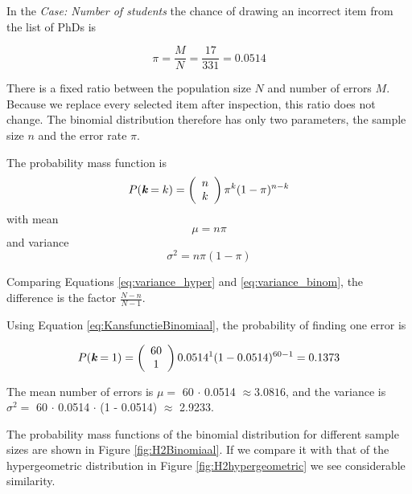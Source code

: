 \bigskip
In the \emph{Case: Number of students} the chance of drawing an incorrect item from the list of PhDs is

\begin{equation*}
\pi = \frac{M}{N} = \frac{17}{331} = 0.0514
\end{equation*}

There is a fixed ratio between the population size $N$ and number of errors $M$. Because we replace every selected item after inspection, this ratio does not change. The binomial distribution therefore has only two parameters, the sample size $n$ and the error rate $\pi$.

\bigskip
The probability mass function is
\begin{equation}
P(\textit{\textbf{k}} = k) = \left(\begin{array}{c}n\\k\end{array}\right)\pi^{k} (1-\pi)^{n-k}
\label{eq:KansfunctieBinomiaal}
\end{equation}
with mean
\begin{equation}
\mu = n\pi
\end{equation}
and variance
\begin{equation}
\sigma^2 = n\pi(1-\pi)
\label{eq:variance_binom}
\end{equation}

Comparing Equations \ref{eq:variance_hyper} and \ref{eq:variance_binom}, the difference is the factor $\frac{N - n}{N - 1}$.

Using Equation \ref{eq:KansfunctieBinomiaal}, the probability of finding one error is 

\begin{equation*}
P(\textit{\textbf{k}} = 1) = \left(\begin{array}{c}60\\1\end{array}\right)0.0514^{1} (1-0.0514)^{60-1} = 0.1373
\end{equation*}

The mean number of errors is $\mu =$ 60 $\cdot$ 0.0514 $\approx 3.0816$, and the variance is $\sigma^2 =$ 60 $\cdot$ 0.0514 $\cdot$ (1 - 0.0514) $\approx$ 2.9233.

The probability mass functions of the binomial distribution for different sample sizes are shown in Figure \ref{fig:H2Binomiaal}. If we compare it with that of the hypergeometric distribution in Figure \ref{fig:H2hypergeometric} we see considerable similarity. 

